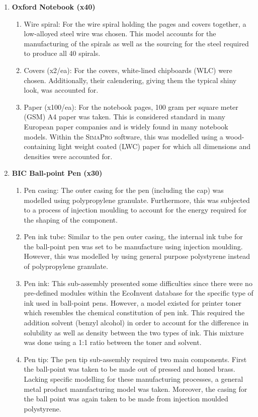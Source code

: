 \begin{enumerate}
    \item \textbf{Oxford Notebook (x40)}
    \begin{enumerate}
        \item Wire spiral: For the wire spiral holding the pages and covers together, a low-alloyed steel wire was chosen. This model accounts for the manufacturing of the spirals as well as the sourcing for the steel required to produce all 40 spirals.
        \item Covers (x2/ea): For the covers, white-lined chipboards (WLC) were chosen. Additionally, their calendering, giving them the typical shiny look, was accounted for.
        \item Paper (x100/ea): For the notebook pages, 100 gram per square meter (GSM) A4 paper was taken. This is considered standard in many European paper companies and is widely found in many notebook models. Within the \textsc{SimaPro} software, this was modelled using a wood-containing light weight coated (LWC) paper for which all dimensions and densities were accounted for.
    \end{enumerate}
    \item \textbf{BIC Ball-point Pen (x30)}
    \begin{enumerate}
        \item Pen casing: The outer casing for the pen (including the cap) was modelled using polypropylene granulate. Furthermore, this was subjected to a process of injection moulding to account for the energy required for the shaping of the component.
        \item Pen ink tube: Similar to the pen outer casing, the internal ink tube for the ball-point pen was set to be manufacture using injection moulding. However, this was modelled by using general purpose polystyrene instead of polypropylene granulate.
        \item Pen ink: This sub-assembly presented some difficulties since there were no pre-defined modules within the EcoInvent database for the specific type of ink used in ball-point pens. However, a model existed for printer toner which resembles the chemical constitution of pen ink. This required the addition solvent (benzyl alcohol) in order to account for the difference in solubility as well as density between the two types of ink. This mixture was done using a 1:1 ratio between the toner and solvent.
        \item Pen tip: The pen tip sub-assembly required two main components. First the ball-point was taken to be made out of pressed and honed brass. Lacking specific modelling for these manufacturing processes, a general metal product manufacturing model was taken. Moreover, the casing for the ball point was again taken to be made from injection moulded polystyrene.
    \end{enumerate}
\end{enumerate}


